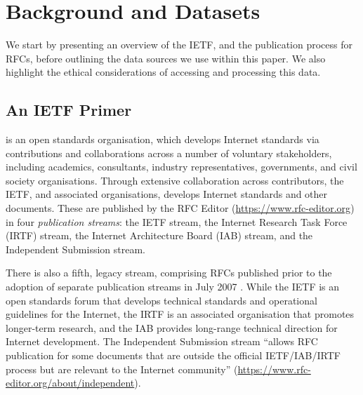 \documentclass[twocolumn,10pt]{article}
\newcommand{\pb}[1]{\vspace{0.75ex}\noindent{\textbf{#1}}}
\begin{document}
\section{Background and Datasets}
\label{sec:background}


We start by presenting an overview of the IETF, and the publication process
for RFCs, before outlining the data sources we use within this paper. We
also highlight the ethical considerations of accessing and processing this
data.


\subsection{An IETF Primer}


\pb{The IETF} is an open standards organisation, which develops
Internet standards via contributions and collaborations across a number of
voluntary stakeholders, including academics, consultants, industry
representatives, governments, and civil society organisations.  Through
extensive collaboration across contributors, the IETF, and associated
organisations, develops Internet standards and other documents. These are
published by the RFC Editor (\url{https://www.rfc-editor.org}) in four
\emph{publication streams}: the IETF stream, the Internet Research Task
Force (IRTF) stream, the Internet Architecture Board (IAB) stream, and the
Independent Submission stream.

There is also a fifth, legacy stream, comprising RFCs published prior to
the adoption of separate publication streams in July 2007 \cite{RFC4844}.
While the IETF is an open standards forum that develops technical standards
and operational guidelines for the Internet, the IRTF is an associated
organisation that promotes longer-term research, and the IAB provides
long-range technical direction for Internet development. The Independent
Submission stream ``allows RFC publication for some documents that are
outside the official IETF/IAB/IRTF process but are relevant to the Internet
community'' (\url{https://www.rfc-editor.org/about/independent}).
\end{document}
